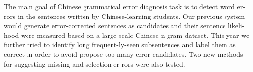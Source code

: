 The main goal of Chinese grammatical error diagnosis task is to detect word er-rors in the sentences written by Chinese-learning students.  Our previous system would generate error-corrected sentences as candidates and their sentence likeli-hood were measured based on a large scale Chinese n-gram dataset.  This year we further tried to identify long frequent-ly-seen subsentences and label them as correct in order to avoid propose too many error candidates.  Two new methods for suggesting missing and selection er-rors were also tested.
